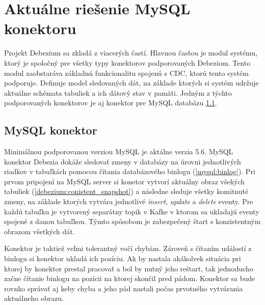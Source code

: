 \chapter{Aktuálne riešenie MySQL konektoru}
Projekt Debezium sa zkladá z viacerých častí. Hlavnou časťou je modul systému, ktorý je spoločný pre všetky typy konektorov podporovaných Debeziom. Tento modul zaobstaráva základnú funkcionalitu spojenú s CDC, ktorú tento systém podporuje. Definuje model sledovaných dát, na základe ktorých si systém udržuje aktuálne schémata tabuliek a ich dátový stav v pamäti. Jedným z týchto podporovaných konektorov je aj konektor pre MySQL databázu \ref{debezium:mysql_connector}.

\section{MySQL konektor}\label{debezium:mysql_connector}
Minimálnou podporovanou verziou MySQL je aktálne verzia 5.6. MySQL konektor Debezia dokáže sledovať zmeny v databázy na úrovni jednotlivých riadkov v tabuľkách pomocou čítania databázového binlogu (\ref{mysql:binlog}). Pri prvom pripojení na MySQL server si konetor vytvorí aktuálny obraz všekých tabuliek (\ref{debezium:conistent_snapshot}) a následne sleduje všetky komitnuté zmeny, na základe ktorých vytvára jednotlivé \textit{insert}, \textit{update} a \textit{delete} eventy. Pre každú tabuľku je vytvorený separátny topik v Kafke v ktorom sa ukladajú eventy spojené z danou tabuľkou. Týmto spôsobom je zabezpečený štart s konzistentným obrazom všetkých dát.

Konektor je taktiež veľmi tolerantný vočí chybám. Zároveň s čítaním událostí z binlogu si konektor ukladá ich pozíciu. Ak by nastala akákolvek situácia pri ktorej by konektor prestal pracovať a bol by nutný jeho reštart, tak jednoducho začne čítanie binlogu na pozícii na ktorej skončil pred pádom. Konektor sa bude rovnko správať aj keby chyba a jeho pád nastali počas prvotného vytvárania aktuálneho obrazu.

